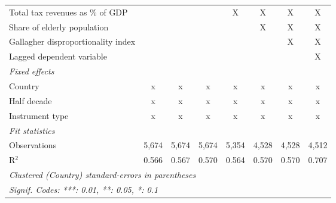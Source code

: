 \begin{tabular}{lccccccc}
   Total tax revenues as \% of GDP                                                           &               &              &               & X            & X           & X       & X\\  
   Share of elderly population                                                               &               &              &               &              & X           & X       & X\\  
   Gallagher disproportionality index                                                        &               &              &               &              &             & X       & X\\  
   Lagged dependent variable                                                                 &               &              &               &              &             &         & X\\  
   \emph{Fixed effects}\\
   Country                                                                                   & x             & x            & x             & x            & x           & x       & x\\  
   Half decade                                                                               & x             & x            & x             & x            & x           & x       & x\\  
   Instrument type                                                                           & x             & x            & x             & x            & x           & x       & x\\  
   \midrule \emph{Fit statistics}\\
   Observations                                                                              & 5,674         & 5,674        & 5,674         & 5,354        & 4,528       & 4,528   & 4,512\\  
   R$^2$                                                                                     & 0.566         & 0.567        & 0.570         & 0.564        & 0.570       & 0.570   & 0.707\\  
   \midrule
   \multicolumn{8}{l}{\emph{Clustered (Country) standard-errors in parentheses}}\\
   \multicolumn{8}{l}{\emph{Signif. Codes: ***: 0.01, **: 0.05, *: 0.1}}\\
\end{tabular}
\par\endgroup


